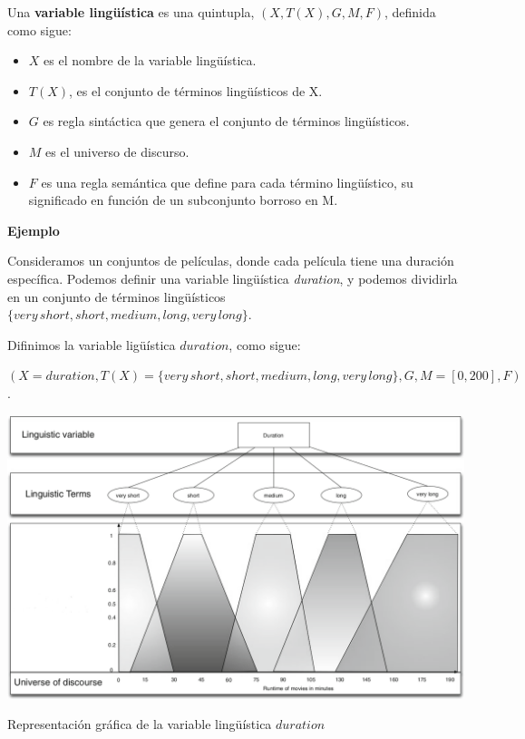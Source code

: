 \documentclass{fancyslides}
\begin{document}
\begin{frame}
\misc
{
Una \textbf{variable lingüística} es una quintupla, $(X, T(X), G, M, F)$, definida como sigue:
\begin{itemize}
  \item $X$ es el nombre de la variable lingüística.
  \item $T(X)$, es el conjunto de términos lingüísticos de X.
  \item \justifying $G$ es regla sintáctica que genera el conjunto de términos lingüísticos.
  \item $M$ es el universo de discurso.
  \item \justifying $F$ es una regla semántica que define para cada término lingüístico, su significado en función de un subconjunto borroso en M.
\end{itemize}

}
\end{frame}


\begin{frame}
\misc
{
\textbf{Ejemplo}
\newline

\justifying Consideramos un conjuntos de películas, donde cada película tiene una duración específica.
Podemos definir una variable lingüística \textit{duration}, y podemos dividirla en un conjunto de términos lingüísticos {\footnotesize $\{ very\,short, short, medium, long, very\,long \}$. }

Difinimos la variable ligüística $duration$, como sigue:

{\footnotesize $(X = duration, T(X) = \{ very\,short, short, medium, long, very\,long \}, G, M = [0,200], F)$}.
}
\end{frame}

\begin{frame}
\misc
{
\begin{center}
\includegraphics[scale=0.2]{fuzzy1}

Representación gráfica de la variable lingüística $duration$
\end{center}
}
\end{frame}
\end{document}

